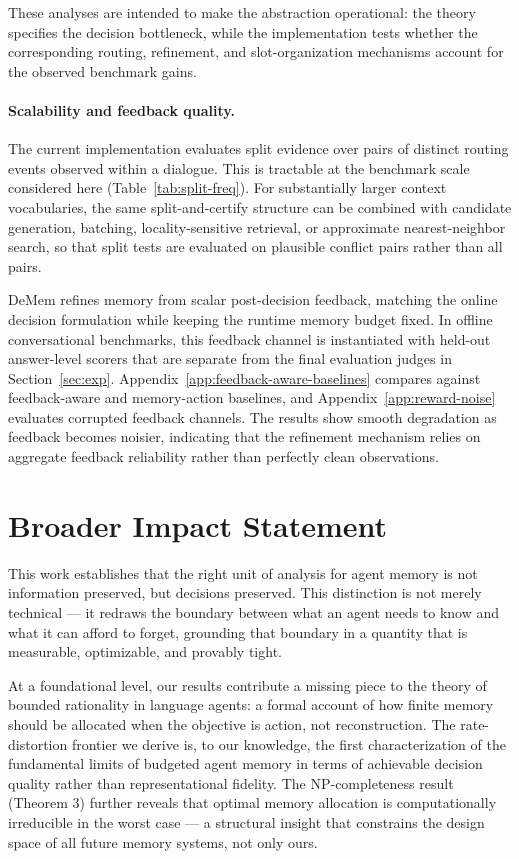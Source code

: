 \documentclass{article}
\theoremstyle{plain}
\theoremstyle{definition}
\theoremstyle{remark}
\begin{document}
These analyses are intended to make the abstraction operational: the theory
specifies the decision bottleneck, while the implementation tests whether the
corresponding routing, refinement, and slot-organization mechanisms account for
the observed benchmark gains.

\paragraph{Scalability and feedback quality.}
The current implementation evaluates split evidence over pairs of distinct
routing events observed within a dialogue. This is tractable at the benchmark
scale considered here (Table~\ref{tab:split-freq}). For substantially larger
context vocabularies, the same split-and-certify structure can be combined with
candidate generation, batching, locality-sensitive retrieval, or approximate
nearest-neighbor search, so that split tests are evaluated on plausible conflict
pairs rather than all pairs.

DeMem refines memory from scalar post-decision feedback, matching the online
decision formulation while keeping the runtime memory budget fixed. In offline
conversational benchmarks, this feedback channel is instantiated with held-out
answer-level scorers that are separate from the final evaluation judges in
Section~\ref{sec:exp}. Appendix~\ref{app:feedback-aware-baselines} compares
against feedback-aware and memory-action baselines, and
Appendix~\ref{app:reward-noise} evaluates corrupted feedback channels. The
results show smooth degradation as feedback becomes noisier, indicating that
the refinement mechanism relies on aggregate feedback reliability rather than
perfectly clean observations.

\section{Broader Impact Statement}
\label{sec:impact}
This work establishes that the right unit of analysis for agent memory is not information preserved, but decisions preserved. This distinction is not merely technical — it redraws the boundary between what an agent needs to know and what it can afford to forget, grounding that boundary in a quantity that is measurable, optimizable, and provably tight.

At a foundational level, our results contribute a missing piece to the theory of bounded rationality in language agents: a formal account of how finite memory should be allocated when the objective is action, not reconstruction. The rate-distortion frontier we derive is, to our knowledge, the first characterization of the fundamental limits of budgeted agent memory in terms of achievable decision quality rather than representational fidelity. The NP-completeness result (Theorem 3) further reveals that optimal memory allocation is computationally irreducible in the worst case — a structural insight that constrains the design space of all future memory systems, not only ours.
\end{document}
